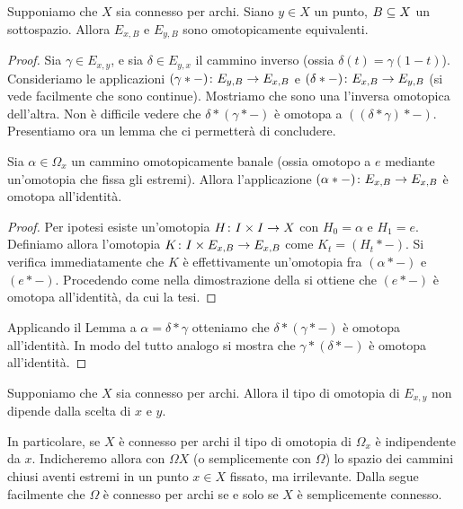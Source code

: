 \begin{proposition}
Supponiamo che $X$ sia connesso per archi. Siano $y\in X$ un punto, $B\subseteq X$ un sottospazio. Allora $E_{x,B}$ e $E_{y,B}$ sono omotopicamente equivalenti.
\end{proposition}
\begin{proof}
Sia $\gamma\in E_{x,y}$, e sia $\delta\in E_{y,x}$ il cammino inverso (ossia $\delta(t)=\gamma(1-t)$). Consideriamo le applicazioni $(\gamma\ast-)\colon E_{y,B}\to E_{x,B}$ e $(\delta\ast-)\colon E_{x,B}\to E_{y,B}$ (si vede facilmente che sono continue). Mostriamo che sono una l'inversa omotopica dell'altra. Non è difficile vedere che $\delta\ast(\gamma\ast-)$ è omotopa a $((\delta\ast\gamma)\ast-)$. Presentiamo ora un lemma  che ci permetterà di concludere.
\begin{lemma}
Sia $\alpha\in\Omega_x$ un cammino omotopicamente banale (ossia omotopo a $e$ mediante un'omotopia che fissa gli estremi). Allora l'applicazione $(\alpha\ast-)\colon E_{x,B}\to E_{x,B}$ è omotopa all'identità.
\end{lemma}
\begin{proof}
Per ipotesi esiste un'omotopia $H\colon I\times I\to X$ con $H_0=\alpha$ e $H_1=e$. Definiamo allora l'omotopia $K\colon I\times E_{x,B}\to E_{x,B}$ come $K_t=(H_t\ast-)$. Si verifica immediatamente che $K$ è effettivamente un'omotopia fra $(\alpha\ast-)$ e $(e\ast-)$. Procedendo come nella dimostrazione della  si ottiene che $(e\ast-)$ è omotopa all'identità, da cui la tesi.
\end{proof}
Applicando il Lemma a $\alpha=\delta\ast\gamma$ otteniamo che $\delta\ast(\gamma\ast-)$ è omotopa all'identità. In modo del tutto analogo si mostra che $\gamma\ast(\delta\ast-)$ è omotopa all'identità.
\end{proof}
\begin{corollary}
Supponiamo che $X$ sia connesso per archi. Allora il tipo di omotopia di $E_{x,y}$ non dipende dalla scelta di $x$ e $y$.
\end{corollary}
In particolare, se $X$ è connesso per archi il tipo di omotopia di $\Omega_x$ è indipendente da $x$. Indicheremo allora con $\Omega X$ (o semplicemente con $\Omega$) lo spazio dei cammini chiusi aventi estremi in un punto $x\in X$ fissato, ma irrilevante. Dalla  segue facilmente che $\Omega$ è connesso per archi se e solo se $X$ è semplicemente connesso.

